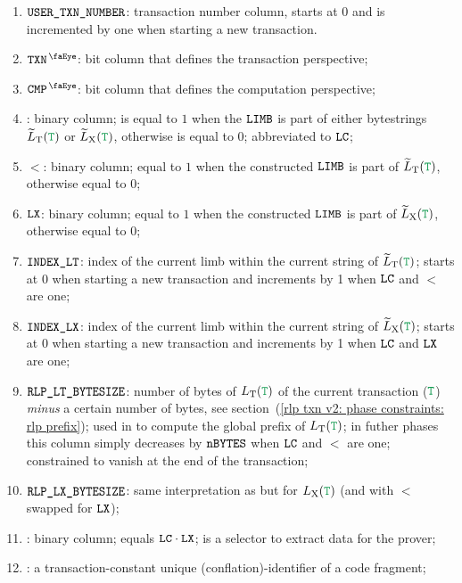 \begin{enumerate}
    \item $\texttt{USER}\texttt{\_}\texttt{TXN\_NUMBER}$:
	transaction number column, starts at 0 and is incremented by one when starting a new transaction.
    \item $\isTxn$:
	bit column that defines the transaction perspective;
    \item $\isCmp$:
	bit column that defines the computation perspective;
    \item {}:
	binary column;
	is equal to $1$ when the $\texttt{LIMB}$ is part of either \rlp{} bytestrings $\locLtTilde(\locTransaction)$ or $\locLxTilde(\locTransaction)$, otherwise is equal to $0$;
	abbreviated to $\texttt{LC}$;
	\item $\lt$:
	binary column; equal to $1$ when the constructed $\texttt{LIMB}$ is part of $\locLtTilde(\locTransaction)$, otherwise equal to $0$;
    \item $\texttt{LX}$:
	binary column; equal to $1$ when the constructed $\texttt{LIMB}$ is part of $\locLxTilde(\locTransaction)$, otherwise equal to $0$;
    \item $\texttt{INDEX\_LT}$:
	index of the current limb within the current string of $\locLtTilde(\locTransaction)$;
	starts at $0$ when starting a new transaction and increments by 1 when $\texttt{LC}$ and $\lt$ are one; 
    \item $\texttt{INDEX\_LX}$:                                                       
	index of the current limb within the current string of $\locLxTilde(\locTransaction)$;
	starts at $0$ when starting a new transaction and increments by 1 when $\texttt{LC}$ and $\texttt{LX}$ are one;
    \item $\texttt{RLP\_LT\_BYTESIZE}$:
	number of bytes of $L_{\mathrm{T}}(\locTransaction)$ of the current transaction ($\locTransaction$) \emph{minus} a certain number of bytes,
	see section~(\ref{rlp txn v2: phase constraints: rlp prefix});
	used in \phaseRlpPrefix{} to compute the global \rlp{} prefix of $L_{\mathrm{T}}(\locTransaction)$;
	in futher phases this column simply decreases by $\texttt{nBYTES}$ when $\texttt{LC}$ and $\lt$ are one;
	constrained to vanish at the end of the transaction;
    \item $\texttt{RLP\_LX\_BYTESIZE}$:
	same interpretation as \rlptsize{} but for $L_{\mathrm{X}}(\locTransaction)$
	(and with $\lt$ swapped for $\texttt{LX}$);
    \item \toHashByProver{}:
	binary column; equals $\texttt{LC} \cdot \texttt{LX}$; is a selector to extract data for the prover;
	\item \CFI{}:
	a transaction-constant unique (conflation)-identifier of a code fragment;
\end{enumerate}
